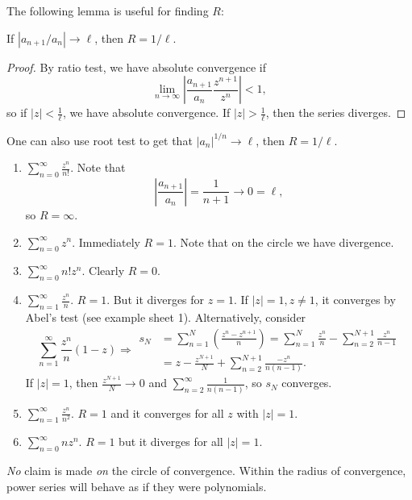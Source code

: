 The following lemma is useful for finding $R$: 
\begin{lemma}\label{lma:4.3}
    If $ |a_{n+1}/a_n|\to \ell $, then $ R = 1/\ell $.
\end{lemma}
\begin{proof}
    By ratio test, we have absolute convergence if 
    \[
        \lim_{n \to \infty} \left| \frac{a_{n+1}}{a_n}\frac{z^{n+1}}{z^n} \right| <1, 
    \]
    so if $ |z|<\frac{1}{\ell} $, we have absolute convergence. If $ |z|>\frac{1}{\ell} $, then the series diverges.
\end{proof}
\begin{remark}
    One can also use root test to get that $ |a_n|^{1/n}\to \ell $, then $ R = 1/\ell $.
\end{remark}
\begin{example}
    \begin{enumerate}
        \item $\displaystyle \sum_{n=0}^{\infty}\frac{z^n}{n!}$. Note that 
        \[
            \left| \frac{a_{n+1}}{a_n} \right|  = \frac{1}{n+1}\to 0=\ell,
        \]
        so $ R=\infty $.
        \item $\displaystyle \sum_{n=0}^{\infty}z^n$. Immediately $ R=1 $. Note that on the circle we have divergence.
        \item $\displaystyle \sum_{n=0}^{\infty}n!z^n$. Clearly $ R=0 $.
        \item $\displaystyle \sum_{n=1}^{\infty}\frac{z^n}{n}$. $ R=1 $. But it diverges for $z=1$. If $ |z|=1,z\neq 1 $, it converges by Abel's test (see example sheet 1). Alternatively, consider 
        \[
            \sum_{n=1}^{\infty}\frac{z^n}{n}(1-z) \Longrightarrow \begin{aligned}
                s_N &= \sum_{n=1}^{N}\left( \frac{z^n-z^{n+1}}{n} \right) = \sum_{n=1}^{N}\frac{z^n}{n}-\sum_{n=2}^{N+1}\frac{z^{n}}{n-1}\\ 
                &= z-\frac{z^{N+1}}{N}+ \sum_{n=2}^{N+1}\frac{-z^n}{n(n-1)}.
            \end{aligned}
        \]
        If $ |z|=1 $, then $ \frac{z^{N+1}}{N}\to 0 $ and $ \sum_{n=2}^{\infty}\frac{1}{n(n-1)} $, so $s_N$ converges.
        \item $\displaystyle \sum_{n=1}^{\infty} \frac{z^n}{n^2}$. $ R=1 $ and it converges for all $z$ with $|z|=1$.
        \item $\displaystyle \sum_{n=0}^{\infty} nz^n$. $ R=1 $ but it diverges for all $ |z|=1 $.  
    \end{enumerate}
\end{example}
\begin{remark}
    \textit{No} claim is made \textit{on} the circle of convergence. Within the radius of convergence, power series will behave as if they were polynomials.
\end{remark}

